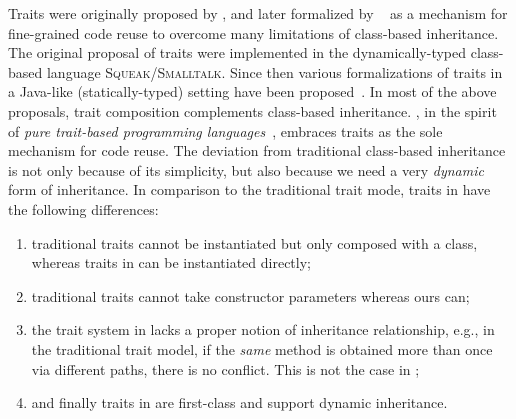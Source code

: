 Traits were originally proposed by \citet{scharli2003traits}, and later formalized by ~\cite{Ducasse_2006} as a mechanism
for fine-grained code reuse to overcome many limitations of class-based
inheritance. The original proposal of traits were implemented in the
dynamically-typed class-based language \textsc{Squeak/Smalltalk}. Since then
various formalizations of traits in a Java-like (statically-typed) setting have
been proposed~\citep{fisher2004typed,scharli2003traitsformal,chai_trait,
  JOT:issue_2006_05/article4}. In most of the above proposals, trait composition
complements class-based inheritance. \sedel, in the spirit of \textit{pure trait-based programming languages}~\citep{BETTINI2013521, BETTINI2017419},
embraces traits as the sole mechanism for code reuse. The deviation from
traditional class-based inheritance is not only because of its simplicity, but
also because we need a very \emph{dynamic} form of inheritance. In comparison to
the traditional trait mode, traits in \sedel have the following differences:
\begin{enumerate}
\item traditional traits cannot be instantiated but only composed with a class,
  whereas traits in \sedel can be instantiated directly;
\item traditional traits cannot take constructor parameters whereas ours can;
\item the trait system in \sedel lacks a proper notion of inheritance
  relationship, e.g., in the traditional trait model, if the \textit{same}
  method is obtained more than once via different paths, there is no conflict.
  This is not the case in \sedel;
\item and finally traits in \sedel are first-class and support dynamic
  inheritance.
\end{enumerate}




